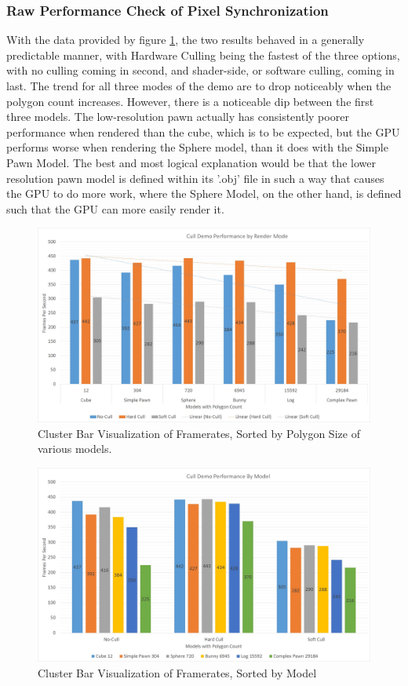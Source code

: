 \documentclass[a4paper, 12pt]{article}
\begin{document}
\subsubsection{Raw Performance Check of Pixel Synchronization}

With the data provided by figure \ref{pic:CDGraph}, the two results behaved in
a generally predictable manner, with Hardware Culling being the fastest of the
three options, with no culling coming in second, and shader-side, or software
culling, coming in last. The trend for all three modes of the demo are to drop
noticeably when the polygon count increases. However, there is a noticeable
dip between the first three models. The low-resolution pawn actually has
consistently poorer performance when rendered than the cube, which is to be
expected, but the GPU performs worse when rendering the Sphere model, than it
does with the Simple Pawn Model. The best and most logical explanation would
be that the lower resolution pawn model is defined within its '.obj' file in
such a way that causes the GPU to do more work, where the Sphere Model, on the
other hand, is defined such that the GPU can more easily render it.

\begin{figure}[!htb]
	\centering
	\includegraphics[width=1.0\textwidth]{cullDemoGraph.jpg}
	\caption{Cluster Bar Visualization of Framerates, Sorted by Polygon Size of various models.}
	\label{pic:CDGraph}
\end{figure}

\begin{figure}[!htb]
	\centering
	\includegraphics[width=1.0\textwidth]{CDByModel.jpg}
	\caption{Cluster Bar Visualization of Framerates, Sorted by Model}
	\label{pic:CDByModel}
\end{figure}
\end{document}
